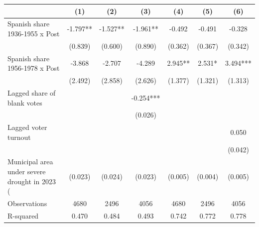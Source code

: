 \begin{table}
\centering
\begin{tabular}[t]{lcccccc}
\toprule
  & (1) & (2) & (3) & (4) & (5) & (6)\\
\midrule
Spanish share 1936-1955 x Post & -1.797** & -1.527** & -1.961** & -0.492 & -0.491 & -0.328\\
 & (0.839) & (0.600) & (0.890) & (0.362) & (0.367) & (0.342)\\
Spanish share 1956-1978 x Post & -3.868 & -2.707 & -4.289 & 2.945** & 2.531* & 3.494***\\
 & (2.492) & (2.858) & (2.626) & (1.377) & (1.321) & (1.313)\\
Lagged share of blank votes &  &  & -0.254*** &  &  & \\
 &  &  & (0.026) &  &  & \\
Lagged voter turnout &  &  &  &  &  & 0.050\\
 &  &  &  &  &  & (0.042)\\
Municipal area under severe drought in 2023 (%
 & (0.023) & (0.024) & (0.023) & (0.005) & (0.004) & (0.005)\\
\midrule
Observations & 4680 & 2496 & 4056 & 4680 & 2496 & 4056\\
R-squared & 0.470 & 0.484 & 0.493 & 0.742 & 0.772 & 0.778\\
\bottomrule
\end{tabular}
\end{table}
